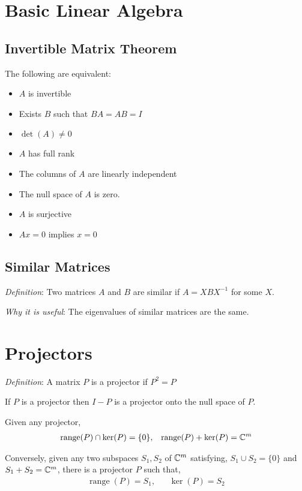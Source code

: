 \documentclass[12pt]{article}
\begin{document}
\pagebreak
\section{Basic Linear Algebra}

\subsection{Invertible Matrix Theorem}
The following are equivalent:
\begin{itemize}[nolistsep]
    \item \( A \) is invertible
    \item Exists \( B \) such that \( BA = AB = I \)
    \item \( \det(A) \neq 0 \)
    \item \( A \) has full rank
    \item The columns of \( A \) are linearly independent
    \item The null space of \( A \) is zero.
    \item \( A \) is surjective
    \item \( Ax = 0 \) implies \( x = 0 \)
\end{itemize}


\subsection{Similar Matrices}
\textit{Definition}: Two matrices \( A \) and \( B \) are similar if \( A = XBX^{-1} \) for some \( X \).

\textit{Why it is useful}: The eigenvalues of similar matrices are the same.

\pagebreak
\section{Projectors}
\textit{Definition}: A matrix \( P \) is a projector if \( P^2 = P \)

If \( P \) is a projector then \( I-P \) is a projector onto the null space of \( P \).

Given any projector,
\begin{align*}
    \operatorname{range}(P) \cap \operatorname{ker}(P) = \{0\}
    ,&&
    \operatorname{range}(P) + \operatorname{ker}(P) = \mathbb{C}^{m}
\end{align*}

Conversely, given any two subspaces \( S_1,S_2 \) of \( \mathbb{C}^m \) satisfying, \( S_1\cup S_2 = \{0\} \) and \( S_1+S_2=\mathbb{C}^m \), there is a projector \( P \) such that,
\begin{align*}
    \operatorname{range}(P) = S_1, &&
    \operatorname{ker}(P) = S_2
\end{align*}
\end{document}

